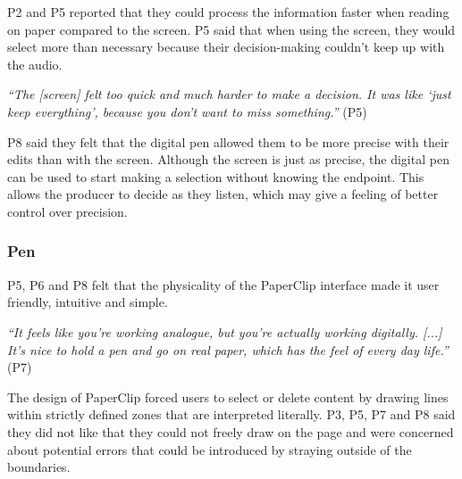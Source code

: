 

P2 and P5 reported that they could process the information faster when reading on paper compared to the screen. P5 said
that when using the screen, they would select more than necessary because their decision-making couldn't keep up with
the audio.


\textit{``The [screen] felt too quick and much harder to make a decision. It was like
  `just keep everything', because you don't want to miss something.''} (P5)

P8 said they felt that the digital pen allowed them to be more precise with their edits than with the screen.  Although
the screen is just as precise, the digital pen can be used to start making a selection without knowing the endpoint.
This allows the producer to decide as they listen, which may give a feeling of better control over precision.



\subsubsection{Pen}

P5, P6 and P8 felt that the physicality of the PaperClip interface made it user friendly, intuitive and simple.

\textit{``It feels like you're working analogue, but you're actually working digitally. [...] It's nice to hold a pen
and go on real paper, which has the feel of every day life.''} (P7)

The design of PaperClip forced users to select or delete content by drawing lines within strictly defined zones
that are interpreted literally. P3, P5, P7 and P8 said they did not like that they could not freely draw on the page and were
concerned about potential errors that could be introduced by straying outside of the boundaries.

